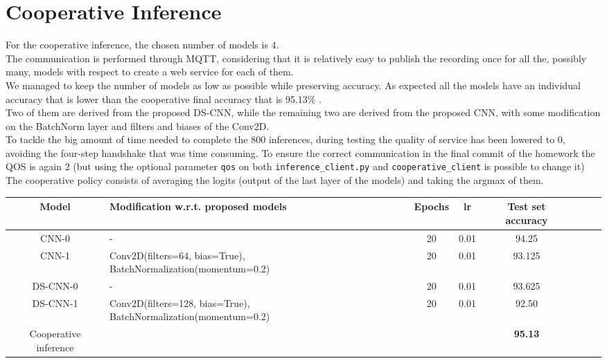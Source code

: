 \documentclass{article}
\begin{document}
\section{Cooperative Inference}
For the cooperative inference, the chosen number of models is 4.\\
The communication is performed through MQTT, considering that it is relatively easy to publish the recording once for all the, possibly many, models with respect to create a web service for each of them.\\
We managed to keep the number of models as low as possible while preserving accuracy.
As expected all the models have an individual accuracy that is lower than the cooperative final accuracy that is 95.13\% .\\
Two of them are derived from the proposed DS-CNN, while the remaining two are derived from the proposed CNN, with some modification on the BatchNorm layer and filters and biases of the Conv2D.\\
To tackle the big amount of time needed to complete the 800 inferences, during testing the quality of service has been lowered to 0,
avoiding the four-step handshake that was time consuming. To ensure the correct communication in the final commit of the homework the
QOS is again 2 (but using the optional parameter \verb#qos# on both \verb#inference_client.py# and \verb#cooperative_client# is possible to change it)\\
The cooperative policy consists of averaging the logits (output of the last layer of the models) and taking the argmax of them.

\vspace{0.2cm}

\begin{center}
\begin{tabular}{ |c|p{6cm}|c|c|c|c|c|c| } 
\hline
\vspace{-0.09cm}

\textbf{Model} &\textbf{Modification w.r.t. proposed models} &\textbf{Epochs}&\textbf{lr} &\textbf{Test set accuracy}\\
\hline
CNN-0&-&20&0.01&94.25\\
CNN-1&Conv2D(filters=64, bias=True), BatchNormalization(momentum=0.2)&20&0.01&93.125\\
DS-CNN-0&-&20&0.01&93.625\\ 
DS-CNN-1&Conv2D(filters=128, bias=True), BatchNormalization(momentum=0.2)&20&0.01&92.50\\
Cooperative inference &&&&\textbf{95.13} \\
\hline

\end{tabular}

\end{center}
\end{document}
